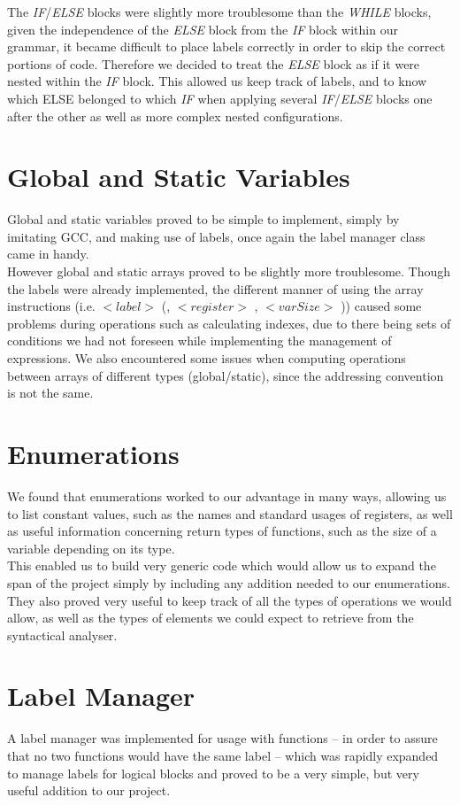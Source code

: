 \documentclass{scrartcl}
\begin{document}
The \emph{IF}/\emph{ELSE} blocks were slightly more troublesome than the \emph{WHILE} blocks, given the independence of the
\emph{ELSE} block from the \emph{IF} block within our grammar, it became difficult to place labels correctly in order to skip the correct portions of code. Therefore we decided to treat the \emph{ELSE} block as if it were nested within the \emph{IF} block. This allowed us keep track of labels, and to know which ELSE belonged to which \emph{IF} when applying several \emph{IF}/\emph{ELSE} blocks one after the other as well as more complex nested configurations.

\section{Global and Static Variables}
Global and static variables proved to be simple to implement, simply by imitating GCC, and making use of labels, once again the label manager class came in handy.\\

However global and static arrays proved to be slightly more troublesome. Though the labels were already implemented, the different manner of using the array instructions (i.e. $ < label >$ (, $ < register >$ , $< varSize>$ )) caused some problems during operations such as calculating indexes, due to there being sets of conditions we had not foreseen while implementing the management of expressions. We also encountered some issues when computing operations between arrays of different types (global/static), since the addressing convention is not the same.

\section{Enumerations}
We found that enumerations worked to our advantage in many ways, allowing us to list constant values, such as the names and standard usages of registers, as well as useful information concerning return types of functions, such as the size of a variable depending on its type.\\

This enabled us to build very generic code which would allow us to expand the span of the project simply by including any addition needed to our enumerations. They also proved very useful to keep track of all the types of operations we would allow, as well as the types of elements we could expect to retrieve from the syntactical analyser.

\section{Label Manager}
A label manager was implemented for usage with functions -- in order to assure that no two functions would have the same label -- which was rapidly expanded to manage labels for logical blocks and proved to be a very simple, but very useful addition to our project.
\end{document}
